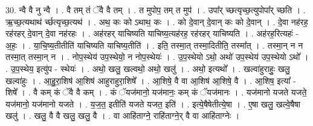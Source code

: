 \documentclass[17pt]{extarticle}
\begin{document}
30. न्वै वै नु न्वै । . वै तम् तं ॅवै वै तम् । . त मुपोप॒ तम् त मुप॑ । . उपा᳚र् च्छत्यृच्छ॒त्युपोपा᳚र् च्छति । . ऋ॒च्छ॒त्यथाथ॑ र्च्छत्यृच्छ॒त्यथ॑ । . अथ॒ कः को ऽथाथ॒ कः । . को दे॒वान् दे॒वान् कः को दे॒वान् । . दे॒वा नह॑रह॒ रह॑रहर् दे॒वान् दे॒वा नह॑रहः । . अह॑रहर् याचिष्यति याचिष्य॒त्यह॑रह॒ रह॑रहर् याचिष्यति । . अह॑रह॒रित्यहः॑ - अ॒हः॒ । . या॒चि॒ष्य॒तीतीति॑ याचिष्यति याचिष्य॒तीति॑ । . इति॒ तस्मा॒त् तस्मा॒दितीति॒ तस्मा᳚त् । . तस्मा॒न् न न तस्मा॒त् तस्मा॒न् न । . नोप॒स्थेय॑ उप॒स्थेयो॒ न नोप॒स्थेयः॑ । . उ॒प॒स्थेयो ऽथो॒ अथो॑ उप॒स्थेय॑ उप॒स्थेयो ऽथो᳚ । . उ॒प॒स्थेय॒ इत्यु॑प - स्थेयः॑ । . अथो॒ खलु॒ खल्वथो॒ अथो॒ खलु॑ । . अथो॒ इत्यथो᳚ । . खल्वा॑हुराहुः॒ खलु॒ खल्वा॑हुः । . आ॒हु॒रा॒शिष॑ आ॒शिष॑ आहुराहुरा॒शिषे᳚ । . आ॒शिषे॒ वै वा आ॒शिष॑ आ॒शिषे॒ वै । . आ॒शिष॒ इत्या᳚ - शिषे᳚ । . वै कम् कं ॅवै वै कम् । . कं ॅयज॑मानो॒ यज॑मानः॒ कम् कं ॅयज॑मानः । . यज॑मानो यजते यजते॒ यज॑मानो॒ यज॑मानो यजते । . य॒ज॒त॒ इतीति॑ यजते यजत॒ इति॑ । . इत्ये॒षैषेतीत्ये॒षा । . ए॒षा खलु॒ खल्वे॒षैषा खलु॑ । . खलु॒ वै वै खलु॒ खलु॒ वै । . वा आहि॑ताग्ने॒ राहि॑ताग्ने॒र् वै वा आहि॑ताग्नेः । \newline
\end{document}
